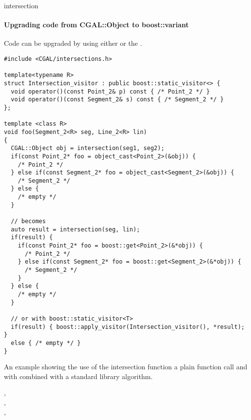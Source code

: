 \begin{ccRefFunction}{intersection}
\paragraph{Upgrading code from CGAL::Object to boost::variant}

Code can be upgraded by using either  or the
.

\ccHtmlLinksOff%
\begin{verbatim}
#include <CGAL/intersections.h>

template<typename R>
struct Intersection_visitor : public boost::static_visitor<> {
  void operator()(const Point_2& p) const { /* Point_2 */ }
  void operator()(const Segment_2& s) const { /* Segment_2 */ }
};

template <class R>
void foo(Segment_2<R> seg, Line_2<R> lin)
{
  CGAL::Object obj = intersection(seg1, seg2);
  if(const Point_2* foo = object_cast<Point_2>(&obj)) {
    /* Point_2 */
  } else if(const Segment_2* foo = object_cast<Segment_2>(&obj)) {
    /* Segment_2 */
  } else {
    /* empty */
  }

  // becomes
  auto result = intersection(seg, lin);
  if(result) {
    if(const Point_2* foo = boost::get<Point_2>(&*obj)) {
      /* Point_2 */
    } else if(const Segment_2* foo = boost::get<Segment_2>(&*obj)) {
      /* Segment_2 */
    }
  } else {
    /* empty */
  }

  // or with boost::static_visitor<T>
  if(result) { boost::apply_visitor(Intersection_visitor(), *result); } 
  else { /* empty */ }
}
\end{verbatim}%
\ccHtmlLinksOn%

\ccExample

An example showing the use of the intersection function a plain function call and with  combined with a standard library algorithm.


\ccSeeAlso
{}, \\
, \\
, \\

\end{ccRefFunction}
